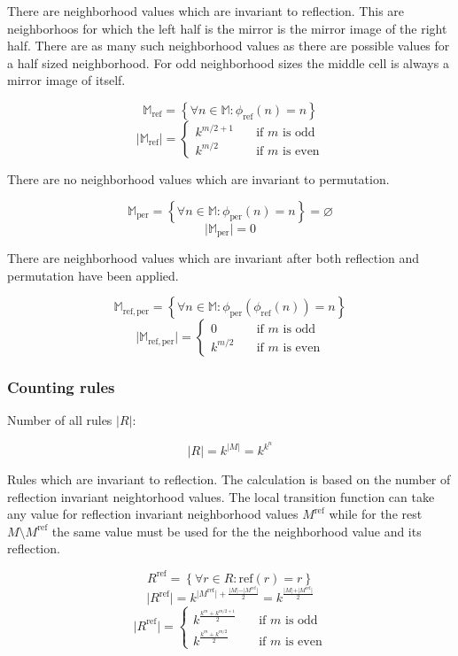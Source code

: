 \documentclass{ijuc}
\begin{document}
There are neighborhood values which are invariant to reflection. This are neighborhoos for which the
left half is the mirror is the mirror image of the right half. There are as many such neighborhood
values as there are possible values for a half sized neighborhood. For odd neighborhood sizes the middle
cell is always a mirror image of itself.

\[ \mathbb{M}_\mathrm{ref} = \left\{ \forall n \in \mathbb{M} : \phi_\mathrm{ref}(n) = n \right\} \]
\[ \vert \mathbb{M}_\mathrm{ref} \vert = \left\{ 
  \begin{array}{ll}
    {k^{m/2+1}} & \quad \textrm{if $m$ is odd }\\
    {k^{m/2  }} & \quad \textrm{if $m$ is even}
  \end{array} \right.
\]

There are no neighborhood values which are invariant to permutation.

\[ \mathbb{M}_\mathrm{per} = \left\{ \forall n \in \mathbb{M} : \phi_\mathrm{per}(n) = n \right\} = \varnothing \]
\[ \vert \mathbb{M}_\mathrm{per} \vert = 0 \]

There are neighborhood values which are invariant after both reflection and permutation have been applied.

\[ \mathbb{M}_\mathrm{ref,per} = \left\{ \forall n \in \mathbb{M} : \phi_\mathrm{per}(\phi_\mathrm{ref}(n)) = n \right\} \]
\[ \vert \mathbb{M}_\mathrm{ref,per} \vert = \left\{ 
  \begin{array}{ll}
    {0        } & \quad \textrm{if $m$ is odd }\\
    {k^{m/2  }} & \quad \textrm{if $m$ is even}
  \end{array} \right.
\]

\subsubsection{Counting rules}

Number of all rules \(\vert R \vert\):

\[ \vert R \vert = k^{\vert M \vert} = k^{k^n} \]

Rules which are invariant to reflection. The calculation is based on the number of
reflection invariant neightorhood values. The local transition function can take any
value for reflection invariant neighborhood values \(M^\mathrm{ref}\) while for the
rest \(M  \setminus M^\mathrm{ref}\) the same value must be used
for the the neighborhood value and its reflection.

\[ R^\mathrm{ref} = \left\{ \forall r \in R : \mathrm{ref}(r) = r \right\} \]
\[ \vert R^\mathrm{ref} \vert = k^{ \vert M^\mathrm{ref} \vert + \frac{\vert M \vert - \vert M^\mathrm{ref} \vert}{2} } = k^{ \frac{\vert M \vert + \vert M^\mathrm{ref} \vert}{2} } \]
\[ \vert R^\mathrm{ref} \vert = \left\{ 
  \begin{array}{ll}
    k^{\frac{k^m + k^{m/2+1}}{2}} & \quad \textrm{if $m$ is odd }\\
    k^{\frac{k^m + k^{m/2  }}{2}} & \quad \textrm{if $m$ is even}
  \end{array} \right.
\]
\end{document}
